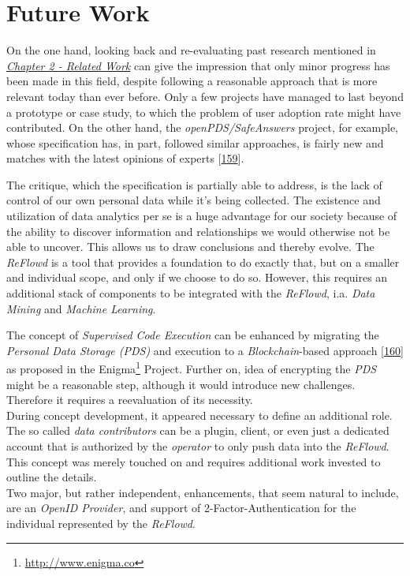 \documentclass[12pt,english,a4paper,titlepage,cleardoublepage=empty,dottedtoc]{report}
\renewcommand{\href}[2]{#2\footnote{\url{#1}}}
\begin{document}
\section{Future Work}\label{future-work}

On the one hand, looking back and re-evaluating past research mentioned
in \emph{\protect\hyperlink{related-work}{Chapter 2 - Related Work}} can
give the impression that only minor progress has been made in this
field, despite following a reasonable approach that is more relevant
today than ever before. Only a few projects have managed to last beyond
a prototype or case study, to which the problem of user adoption rate
might have contributed. On the other hand, the
\emph{openPDS/SafeAnswers} project, for example, whose specification
has, in part, followed similar approaches, is fairly new and matches
with the latest opinions of experts
{[}\protect\hyperlink{ref-web_2017_distributed-future-is-personal}{159}{]}.

The critique, which the specification is partially able to address, is
the lack of control of our own personal data while it's being collected.
The existence and utilization of data analytics per se is a huge
advantage for our society because of the ability to discover information
and relationships we would otherwise not be able to uncover. This allows
us to draw conclusions and thereby evolve. The \emph{ReFlowd} is a tool
that provides a foundation to do exactly that, but on a smaller and
individual scope, and only if we choose to do so. However, this requires
an additional stack of components to be integrated with the
\emph{ReFlowd}, i.a. \emph{Data Mining} and \emph{Machine Learning}.

The concept of \emph{Supervised Code Execution} can be enhanced by
migrating the \emph{Personal Data Storage (PDS)} and execution to a
\emph{Blockchain}-based approach
{[}\protect\hyperlink{ref-paper_2015_decentralizing-privacy-using-blockchain-to-protect-personal-data}{160}{]}
as proposed in the \href{http://www.enigma.co}{Enigma} Project. Further
on, idea of encrypting the \emph{PDS} might be a reasonable step,
although it would introduce new challenges. Therefore it requires a
reevaluation of its necessity.\\
During concept development, it appeared necessary to define an
additional role. The so called \emph{data contributors} can be a plugin,
client, or even just a dedicated account that is authorized by the
\emph{operator} to only push data into the \emph{ReFlowd}. This concept
was merely touched on and requires additional work invested to outline
the details.\\
Two major, but rather independent, enhancements, that seem natural to
include, are an \emph{OpenID Provider}, and support of
2-Factor-Authentication for the individual represented by the
\emph{ReFlowd}.
\end{document}
